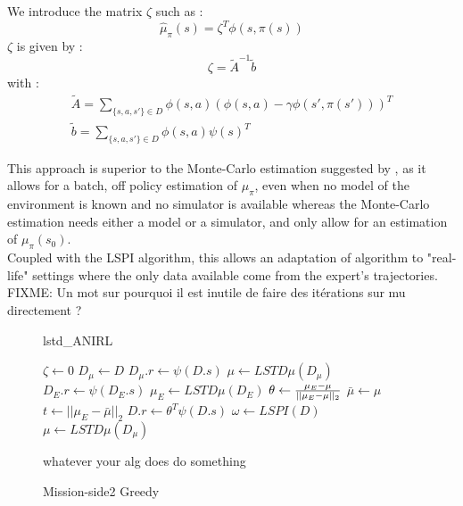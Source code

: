\documentclass{article}
\begin{document}
We introduce the matrix $\zeta$ such as :
\begin{equation}
\hat \mu_\pi (s) = \zeta^T\phi(s,\pi(s))
\end{equation}
$\zeta$ is given by :
\begin{equation}
\zeta = \tilde A^{-1}\tilde b
\end{equation}
with :
\begin{eqnarray}
\tilde A = \sum_{\{s,a,s'\} \in D}\phi(s,a)\left(\phi(s,a) - \gamma \phi(s',\pi(s'))\right)^T\\
\tilde b = \sum_{\{s,a,s'\} \in D} \phi(s,a)\psi(s)^T
\end{eqnarray}

This approach is superior to the Monte-Carlo estimation suggested by \citet{abbeel2004apprenticeship}, as it allows for a batch, off policy estimation of $\mu_\pi$, even when no model of the environment is known and no simulator is available whereas the Monte-Carlo estimation needs either a model or a simulator, and only allow for an estimation of $\mu_\pi(s_0)$.\\

Coupled with the LSPI algorithm, this allows an adaptation of \citet{abbeel2004apprenticeship} algorithm to "real-life" settings where the only data available come from the expert's trajectories.\\

FIXME: Un mot sur pourquoi il est inutile de faire des itérations sur mu directement ?
\begin{figure*}
 \begin{minipage}[t]{.45\textwidth}
 \begin{algorithm}[H]
   \caption{lstd\_ANIRL} 
   \label{alg:lstd_anirl} 
   \begin{algorithmic}[1]
     \STATE $\zeta \leftarrow 0$
     \STATE $D_\mu \leftarrow D $
     \STATE $D_\mu.r \leftarrow \psi(D.s)$
     \STATE $\mu \leftarrow LSTD\mu( D_\mu )$
     \STATE $D_E.r \leftarrow \psi(D_E.s)$
     \STATE $\mu_E \leftarrow LSTD\mu( D_E )$
     \STATE $\theta \leftarrow {\mu_E - \mu\over ||\mu_E - \mu||_2}$
     \STATE $ \bar\mu \leftarrow \mu $
     \STATE $ t \leftarrow ||\mu_E - \bar\mu||_2 $
     \STATE $D.r \leftarrow \theta^T\psi(D.s)$
     \STATE $ \omega \leftarrow LSPI(D) $
     \STATE $ \mu \leftarrow LSTD\mu( D_\mu )$
     \ENDWHILE
   \end{algorithmic}
 \end{algorithm}
 \end{minipage}
 \hfill
 \begin{minipage}[t]{.45\textwidth}
   \begin{algorithm}[H]
     \caption{Mission-side2 Greedy} 
     \label{alg2} 
     \begin{algorithmic}[1]
       \STATE whatever your alg does
       \STATE do something
       \ENDFOR
     \end{algorithmic}
   \end{algorithm}
 \end{minipage}
 \hfill
\end{figure*}
\end{document}

